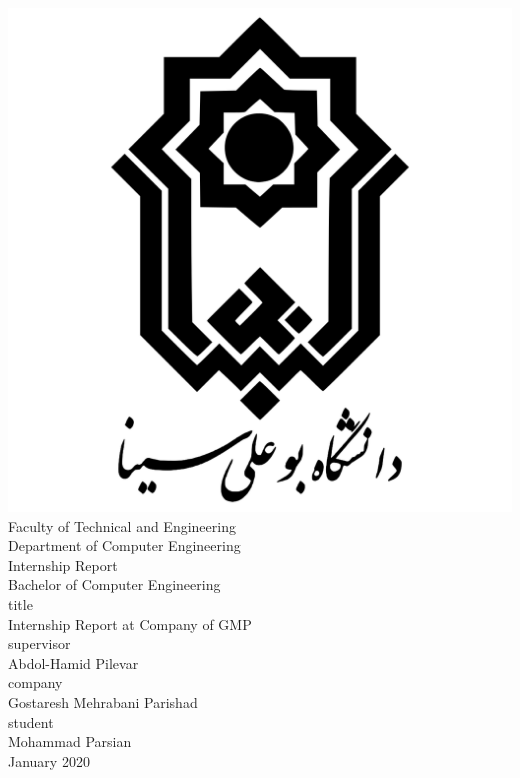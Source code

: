 \documentclass[10pt, a4paper]{report}
\begin{document}
\begin{center}

    \includegraphics[scale=0.12]{basu.png} \\
    {Faculty of Technical and Engineering} \\
    {Department of Computer Engineering} \\[0.3in]

    {\Large Internship Report} \\[0.3in]

    {\Large Bachelor of Computer Engineering} \\[0.4in]

    {\Large title} \\[0.1in]
    {\huge Internship Report at Company of GMP} \\[0.4in]

    {\Large supervisor} \\[0.1in]
    {\LARGE Abdol-Hamid Pilevar} \\[0.4in]

    {\Large company} \\[0.1in]
    {\LARGE Gostaresh Mehrabani Parishad} \\[0.4in]

    {\Large student} \\[0.1in]
    {\LARGE Mohammad Parsian} \\[0.5in]

    {\large January 2020}

\end{center}
\end{document}
